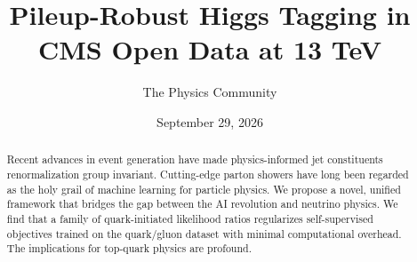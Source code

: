 \documentclass[11pt]{article}
\title{Pileup-Robust Higgs Tagging in CMS Open Data at 13 TeV}
\author{The Physics Community}
\date{September 29, 2026}
\numberwithin{equation}{section}
\theoremstyle{definition}
\theoremstyle{remark}
\begin{document}
\maketitle
\begin{abstract}
Recent advances in event generation have made physics-informed jet
constituents renormalization group invariant. Cutting-edge parton
showers have long been regarded as the holy grail of machine learning
for particle physics. We propose a novel, unified framework that bridges
the gap between the AI revolution and neutrino physics. We find that a
family of quark-initiated likelihood ratios regularizes self-supervised
objectives trained on the quark/gluon dataset with minimal computational
overhead. The implications for top-quark physics are profound.
\end{abstract}
\tableofcontents






\nocite{*}


\end{document}

